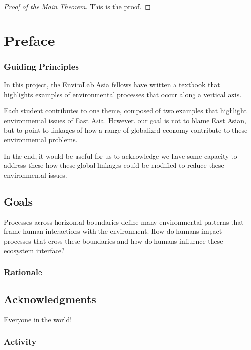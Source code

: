 \begin{proof}
[Proof of the Main Theorem]This is the proof.
\end{proof}

\chapter{Preface}

\subsection{Guiding Principles}

In this project, the EnviroLab Asia fellows have written a textbook that highlights examples of environmental processes that occur along a vertical axis. 

Each student contributes to one theme, composed of two examples that highlight environmental issues of East Asia. However, our goal is not to blame East Asian, but to point to linkages of how a range of globalized economy contribute to these environmental problems. 

In the end, it would be useful for us to acknowledge we have some capacity to address these how these global linkages could be modified to reduce these environmental issues. 

\section{Goals}

Processes across horizontal boundaries define many environmental patterns that frame human interactions with the environment. How do humans impact processes that cross these boundaries and how do humans influence these ecosystem interface?

\subsection{Rationale}


\section{Acknowledgments}

Everyone in the world!

\subsection{Activity}


